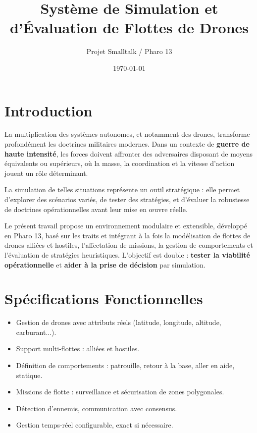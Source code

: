 \documentclass[a4paper,11pt]{article}
\title{Système de Simulation et d'Évaluation de Flottes de Drones}
\author{Projet Smalltalk / Pharo 13}
\date{\today}
\begin{document}
\maketitle

\tableofcontents

\section{Introduction}

La multiplication des systèmes autonomes, et notamment des drones, transforme profondément
les doctrines militaires modernes. Dans un contexte de \textbf{guerre de haute intensité},
les forces doivent affronter des adversaires disposant de moyens équivalents ou supérieurs,
où la masse, la coordination et la vitesse d'action jouent un rôle déterminant.  

La simulation de telles situations représente un outil stratégique : elle permet d'explorer
des scénarios variés, de tester des stratégies, et d'évaluer la robustesse de doctrines
opérationnelles avant leur mise en œuvre réelle.  

Le présent travail propose un environnement modulaire et extensible, développé en Pharo 13,
basé sur les traits et intégrant à la fois la modélisation de flottes de drones alliées et
hostiles, l'affectation de missions, la gestion de comportements et l'évaluation de stratégies
heuristiques. L'objectif est double : \textbf{tester la viabilité opérationnelle} et
\textbf{aider à la prise de décision} par simulation.

\section{Spécifications Fonctionnelles}
\begin{itemize}
  \item Gestion de drones avec attributs réels (latitude, longitude, altitude, carburant...).
  \item Support multi-flottes : alliées et hostiles.
  \item Définition de comportements : patrouille, retour à la base, aller en aide, statique.
  \item Missions de flotte : surveillance et sécurisation de zones polygonales.
  \item Détection d'ennemis, communication avec consensus.
  \item Gestion temps-réel configurable, exact si nécessaire.
\end{itemize}
\end{document}
